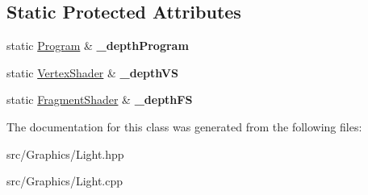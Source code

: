 \subsection*{Static Protected Attributes}
\begin{DoxyCompactItemize}
\item 
\hypertarget{class_light_aafd9db4848ed10a25adaa162559175a1}{static \hyperlink{class_program}{Program} \& {\bfseries \+\_\+depth\+Program}}\label{class_light_aafd9db4848ed10a25adaa162559175a1}

\item 
\hypertarget{class_light_a6e7e72476eb23068a660e499182e5dfa}{static \hyperlink{class_vertex_shader}{Vertex\+Shader} \& {\bfseries \+\_\+depth\+V\+S}}\label{class_light_a6e7e72476eb23068a660e499182e5dfa}

\item 
\hypertarget{class_light_a3a3c726b7846ccb2393740ed22878d13}{static \hyperlink{class_fragment_shader}{Fragment\+Shader} \& {\bfseries \+\_\+depth\+F\+S}}\label{class_light_a3a3c726b7846ccb2393740ed22878d13}

\end{DoxyCompactItemize}


The documentation for this class was generated from the following files\+:\begin{DoxyCompactItemize}
\item 
src/\+Graphics/Light.\+hpp\item 
src/\+Graphics/Light.\+cpp\end{DoxyCompactItemize}
